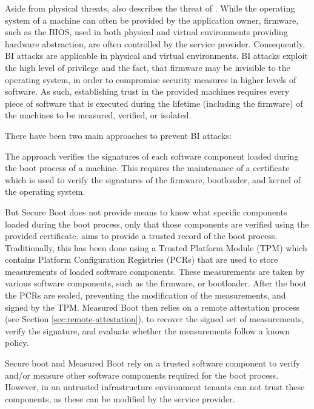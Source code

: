 \begin{description}
    Aside from physical threats, \citeauthor{weis2014protecting} also describes
    the threat of . While the operating
    system of a machine can often be provided by the application owner,
    firmware, such as the BIOS, used in both physical and virtual environments
    providing hardware abstraction, are often controlled by the service
    provider. Consequently, BI attacks are applicable in physical and virtual
    environments. BI attacks exploit the high level of privilege and the fact,
    that firmware may be invisible to the operating system, in order to
    compromise security measures in higher levels of software. As such,
    establishing trust in the provided machines requires every piece of software
    that is executed during the lifetime (including the firmware) of the
    machines to be measured, verified, or isolated.

    There have been two main approaches to prevent BI attacks:

    The  approach verifies the signatures of each software
    component loaded during the boot process of a machine. This requires the
    maintenance of a certificate which is used to verify the signatures of the
    firmware, bootloader, and kernel of the operating system.

    But Secure Boot does not provide means to know what specific components
    loaded during the boot process, only that those components are verified
    using the provided certificate.  aims to provide a
    trusted record of the boot process. Traditionally, this has been done using
    a Trusted Platform Module (TPM) which contains Platform Configuration
    Registries (PCRs) that are used to store measurements of loaded software
    components. These measurements are taken by various software components,
    such as the firmware, or bootloader. After the boot the PCRs are sealed,
    preventing the modification of the measurements, and signed by the TPM.
    Measured Boot then relies on a remote attestation process (see Section
    \ref{sec:remote-attestation}), to recover the signed set of measurements,
    verify the signature, and evaluate whether the measurements follow a known
    policy.

    Secure boot and Measured Boot rely on a trusted software component to verify
    and/or measure other software components required for the boot process.
    However, in an untrusted infrastructure environment tenants can not trust
    these components, as these can be modified by the service provider.
\end{description}

